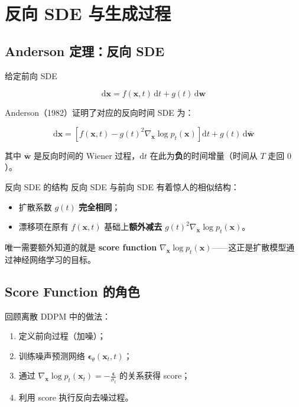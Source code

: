 \documentclass[a4paper]{article}
\begin{document}
\section{反向 SDE 与生成过程}

\subsection{Anderson 定理：反向 SDE}

给定前向 SDE

$$
\mathrm{d}\mathbf{x} = f(\mathbf{x}, t)\,\mathrm{d}t + g(t)\,\mathrm{d}\mathbf{w}
$$

Anderson（1982）证明了对应的反向时间 SDE 为：

$$
\mathrm{d}\mathbf{x} = \left[f(\mathbf{x}, t) - g(t)^2 \nabla_{\mathbf{x}} \log p_t(\mathbf{x})\right]\mathrm{d}t + g(t)\,\mathrm{d}\bar{\mathbf{w}}
$$

其中 $\bar{\mathbf{w}}$ 是反向时间的 Wiener 过程，$\mathrm{d}t$ 在此为\textbf{负}的时间增量（时间从 $T$ 走回 $0$）。

\begin{importantbox}{反向 SDE 的结构}
反向 SDE 与前向 SDE 有着惊人的相似结构：
\begin{itemize}
    \item 扩散系数 $g(t)$ \textbf{完全相同}；
    \item 漂移项在原有 $f(\mathbf{x}, t)$ 基础上\textbf{额外减去} $g(t)^2 \nabla_{\mathbf{x}} \log p_t(\mathbf{x})$。
\end{itemize}
唯一需要额外知道的就是 \textbf{score function} $\nabla_{\mathbf{x}} \log p_t(\mathbf{x})$——这正是扩散模型通过神经网络学习的目标。
\end{importantbox}

\subsection{Score Function 的角色}

回顾离散 DDPM 中的做法：
\begin{enumerate}
    \item 定义前向过程（加噪）；
    \item 训练噪声预测网络 $\boldsymbol{\epsilon}_\theta(\mathbf{x}_t, t)$；
    \item 通过 $\nabla_{\mathbf{x}} \log p_t(\mathbf{x}_t) = -\frac{\boldsymbol{\epsilon}}{\sigma_t}$ 的关系获得 score；
    \item 利用 score 执行反向去噪过程。
\end{enumerate}
\end{document}
